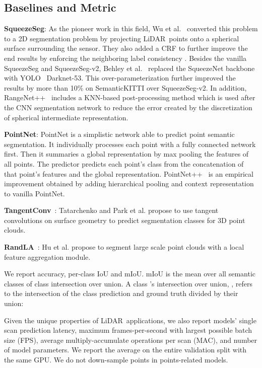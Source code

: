 \documentclass[10pt,twocolumn,letterpaper]{article}
\newcommand{\lidar}{\mbox{LiDAR }}
\begin{document}
\subsection{Baselines and Metric}

\textbf{SqueezeSeg}: As the pioneer work in this field, Wu et al.~\cite{wu2018squeezeseg} converted this problem to a 2D segmentation problem by projecting \lidar points onto a spherical surface surrounding the sensor. They also added a CRF to further improve the end results by enforcing the neighboring label consistency . Besides the vanilla SqueezeSeg and SqueezeSeg-v2, Behley et al.~\cite{behley2019iccv} replaced the SqueezeNet backbone with YOLO~\cite{redmon2018yolov3} Darknet-53. This over-parameterization further improved the results by more than 10\% on SemanticKITTI over SqueezeSeg-v2. In addition, RangeNet++~\cite{milioto2019rangenet++} includes a KNN-based post-processing method which is used after the CNN segmentation network to reduce the error created by the discretization of spherical intermediate representation.

\textbf{PointNet}\cite{qi2017pointnet}: PointNet is a simplistic network able to predict point semantic segmentation. It individually processes each point with a fully connected network first. Then it summaries a global representation by max pooling the features of all points. The predictor predicts each point’s class from the concatenation of that point’s features and the global representation. PointNet++~\cite{qi2017pointnet++} is an empirical improvement obtained by adding hierarchical pooling and context representation to vanilla PointNet.

\textbf{TangentConv}~\cite{Tatarchenko_2018_CVPR}: Tatarchenko and Park et al. propose to use tangent convolutions on surface geometry to predict segmentation classes for 3D point clouds.

\textbf{RandLA}~\cite{hu2019randla}: Hu et al. propose to segment large scale point clouds with a local feature aggregation module.

We report accuracy, per-class IoU and mIoU. mIoU is the mean over all semantic classes of class intersection over union. A class 's intersection over union, , refers to the intersection of the class prediction and ground truth divided by their union:



Given the unique properties of \lidar applications, we also report models' single scan prediction latency, maximum frames-per-second with largest possible batch size (FPS), average multiply-accumulate operations per scan (MAC), and number of model parameters. We report the average on the entire validation split with the same GPU. We do not down-sample points in points-related models.
\end{document}
